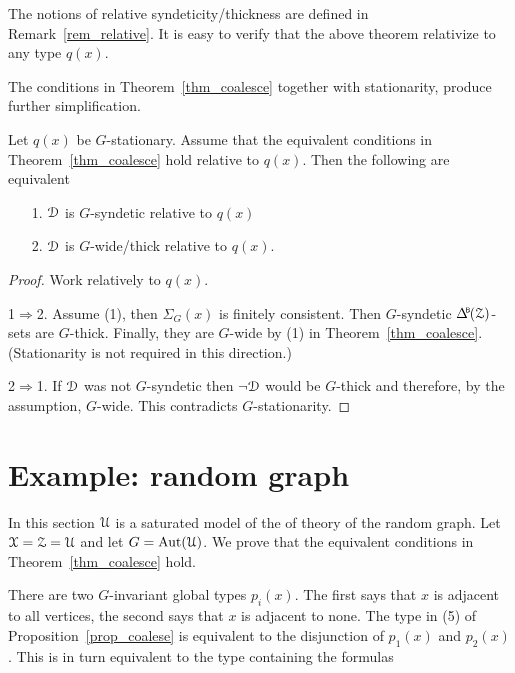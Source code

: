 The notions of relative syndeticity/thickness are defined in Remark~\ref{rem_relative}.
It is easy to verify that the above theorem relativize to any type $q(x)$.

The conditions in Theorem~\ref{thm_coalesce} together with stationarity, produce further simplification.

\begin{fact}\label{fact_stationarity}
  Let $q(x)$ be $G$-stationary.
  Assume that the equivalent conditions in Theorem~\ref{thm_coalesce} hold relative to $q(x)$.
  Then the following are equivalent
  \begin{itemize}
    \item [1.] $\EuScript D$ is $G$-syndetic relative to $q(x)$
    \item [2.] $\EuScript D$ is $G$-wide/thick relative to $q(x)$.
  \end{itemize}
\end{fact}

\begin{proof}
  Work relatively to $q(x)$.

  1$\Rightarrow$2.
  Assume (1), then $\Sigma_G(x)$ is finitely consistent.
  Then $G$-syndetic $\BDelta({\Z})$-sets are $G$-thick.
  Finally, they are $G$-wide by (1) in Theorem~\ref{thm_coalesce}.
  (Stationarity is not required in this direction.)

  2$\Rightarrow$1.
  If $\EuScript D$ was not $G$-syndetic then $\neg\EuScript D$ would be $G$-thick and therefore, by the assumption, $G$-wide.
  This contradicts $G$-stationarity.
\end{proof}

\section{Example: random graph}

In this section $\EuScript U$ is a saturated model of the of theory of the random graph.
Let $\EuScript X=\EuScript Z=\EuScript U$ and let $G={\rm Aut}(\EuScript U)$.
We prove that the equivalent conditions in Theorem~\ref{thm_coalesce} hold.

There are two $G$-invariant global types $p_i(x)$.
The first says that $x$ is adjacent to all vertices, the second says that $x$ is adjacent to none.
The type in (5) of Proposition~\ref{prop_coalese} is equivalent to the disjunction of $p_1(x)$ and $p_2(x)$.
This is in turn equivalent to the type containing the formulas

